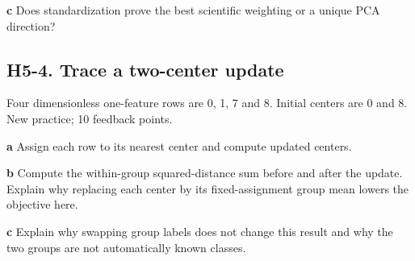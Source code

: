 \documentclass[11pt,letterpaper]{article}
\theoremstyle{definition}\newtheorem{definition}{Definition}\newtheorem{example}{Example}
\numberwithin{equation}{section}
\begin{document}
\textbf{c} Does standardization prove the best scientific weighting or a unique PCA direction?

\par\noindent\begin{minipage}{\linewidth}
\subsection*{H5-4. Trace a two-center update}
Four dimensionless one-feature rows are 0, 1, 7 and 8. Initial centers are 0 and 8. New practice; 10 feedback points.

\textbf{a} Assign each row to its nearest center and compute updated centers.

\end{minipage}\par\medskip
\textbf{b} Compute the within-group squared-distance sum before and after the update. Explain why replacing each center by its fixed-assignment group mean lowers the objective here.

\textbf{c} Explain why swapping group labels does not change this result and why the two groups are not automatically known classes.
\end{document}
